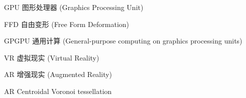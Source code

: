 \begin{denotation}

\item[GPU] 图形处理器 (Graphics Processing Unit)
\item[FFD] 自由变形 (Free Form Deformation)
\item[GPGPU] 通用计算 (General-purpose computing on graphics processing units)
\item[VR] 虚拟现实 (Virtual Reality)
\item[AR] 增强现实 (Augmented Reality)
\item[AR] Centroidal Voronoi tessellation

\end{denotation}
